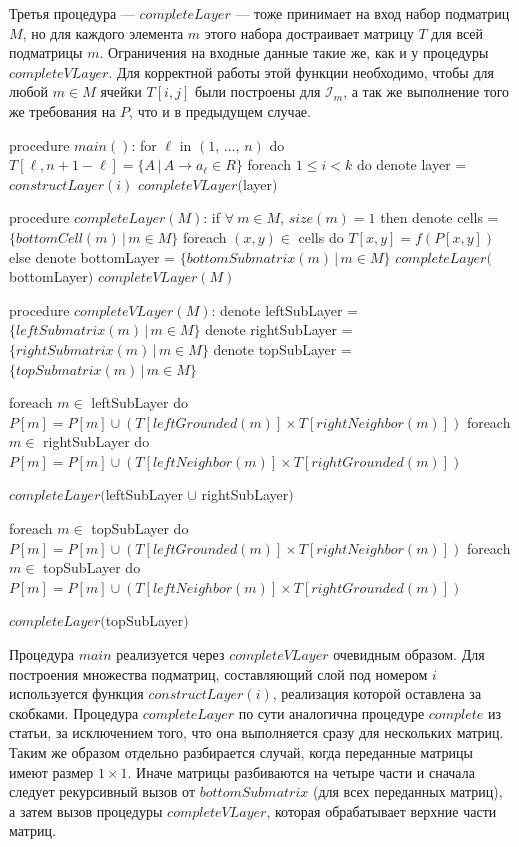\documentclass[12pt]{article}  %
\theoremstyle{definition}
\theoremstyle{remark}
\begin{document}
Третья процедура --- $completeLayer$ --- тоже принимает на вход набор подматриц $M$, но для каждого элемента $m$ этого набора достраивает матрицу $T$ для всей подматрицы $m$. Ограничения на входные данные такие же, как и у процедуры $completeVLayer$. Для корректной работы этой функции необходимо, чтобы для любой $m \in M$ ячейки $T[i,j]$ были построены для $\mathcal{I}_m$, а так же выполнение того же требования на $P$, что и в предыдущем случае. 

\begin{algorithm}[caption={Алгоритм}, label={main}]
procedure $main()$:
  for $\ell$ in $(1,\,\dots,\,n)$ do
    $T[\ell, n+1-\ell] = \{A\,|\,A \to a_{\ell} \in R\}$
  foreach $1 \leqslant i < k$ do
    denote layer = $constructLayer(i)$
    $completeVLayer($layer$)$  

procedure $completeLayer(M)$:
  if $\forall\ m \in M$, $size(m) = 1$ then
    denote cells = $\{bottomCell(m)\,|\, m \in M\}$
    foreach $(x, y) \in $ cells do
      $T[x, y] = f(P[x, y])$
  else
    denote bottomLayer = $\{bottomSubmatrix(m)\,|\,m \in M\}$
    $completeLayer($bottomLayer$)$
    $completeVLayer(M)$     

procedure $completeVLayer(M)$:
  denote leftSubLayer = $\{leftSubmatrix(m)\,|\,m \in M\}$
  denote rightSubLayer = $\{rightSubmatrix(m)\,|\,m \in M\}$
  denote topSubLayer = $\{topSubmatrix(m)\,|\,m \in M\}$

  foreach $m \in$ leftSubLayer do
    $P[m] = P[m] \cup (T[leftGrounded(m)] \times T[rightNeighbor(m)])$
  foreach $m \in$ rightSubLayer do
    $P[m] = P[m] \cup (T[leftNeighbor(m)] \times T[rightGrounded(m)])$

  $completeLayer($leftSubLayer $\cup$ rightSubLayer$)$

  foreach $m \in$ topSubLayer do
    $P[m] = P[m] \cup (T[leftGrounded(m)] \times T[rightNeighbor(m)])$
  foreach $m \in$ topSubLayer do
    $P[m] = P[m] \cup (T[leftNeighbor(m)] \times T[rightGrounded(m)])$

  $completeLayer($topSubLayer$)$  
\end{algorithm}

Процедура $main$ реализуется через $completeVLayer$ очевидным образом. Для построения множества подматриц, составляющий слой под номером $i$ используется функция $constructLayer(i)$, реализация которой оставлена за скобками. Процедура $completeLayer$ по сути аналогична процедуре $complete$ из статьи, за исключением того, что она выполняется сразу для нескольких матриц. Таким же образом отдельно разбирается случай, когда переданные матрицы имеют размер $1 \times 1$. Иначе матрицы разбиваются на четыре части и сначала следует рекурсивный вызов от $bottomSubmatrix$ (для всех переданных матриц), а затем вызов процедуры $completeVLayer$, которая обрабатывает верхние части матриц. 
\end{document}
